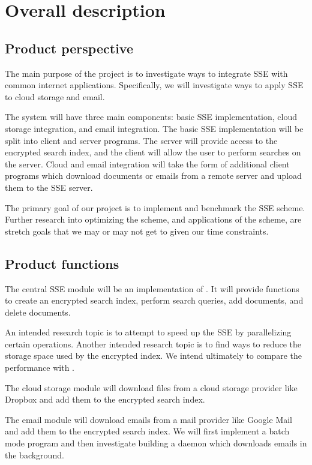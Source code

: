 \documentclass[onecolumn, draftclsnofoot,10pt, compsoc]{IEEEtran}
\begin{document}
\section{ Overall description }
\subsection{ Product perspective }

The main purpose of the project is to investigate ways to integrate SSE with common internet applications.
Specifically, we will investigate ways to apply SSE to cloud storage and email.

The system will have three main components: basic SSE implementation, cloud storage integration, and email integration. The basic SSE implementation will be split into client and server programs. The server will provide access to the encrypted search index, and the client will allow the user to perform searches on the server. Cloud and email integration will take the form of additional client programs which download documents or emails from a remote server and upload them to the SSE server.

The primary goal of our project is to implement and benchmark the SSE scheme.
Further research into optimizing the scheme, and applications of the scheme, are stretch goals that we may or may not get to given our time constraints.

\subsection{ Product functions }

The central SSE module will be an implementation of \cite{cash14}. It will provide functions to create an encrypted search index, perform search queries, add documents, and delete documents.

An intended research topic is to attempt to speed up the SSE by parallelizing certain operations. 
Another intended research topic is to find ways to reduce the storage space used by the encrypted index.
We intend ultimately to compare the performance with \cite{yavuz15}.

The cloud storage module will download files from a cloud storage provider like Dropbox and add them to the encrypted search index.

The email module will download emails from a mail provider like Google Mail and add them to the encrypted search index. We will first implement a batch mode program and then investigate building a daemon which downloads emails in the background.
\end{document}

